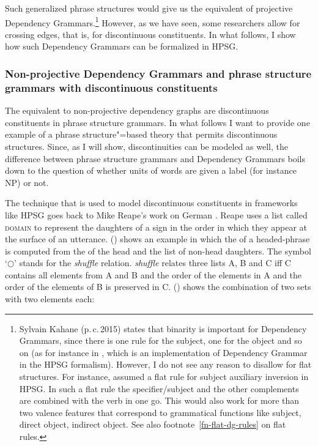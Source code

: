 \noindent
Such generalized phrase structures would give us the equivalent of projective Dependency
Grammars.\footnote{\label{fn-dg-binary-branching}%
Sylvain Kahane (p.\,c.\,2015) states that binarity is important for Dependency Grammars, since
there is one rule for the subject, one for the object and so on (as for instance in
\citealp{Kahane2009a}, which is an implementation of Dependency Grammar in the HPSG formalism). However, I do not see any reason
to disallow for flat structures. For instance, \citet[]{GSag2000a-u} assumed a flat rule for subject
auxiliary inversion in HPSG. In such a flat rule the specifier/subject and the other complements are
combined with the verb in one go. This would also work for more than two valence features that correspond
to grammatical functions like subject, direct object, indirect object. See also
footnote~\ref{fn-flat-dg-rules} on flat rules.
} However, as we have seen, some researchers allow for crossing edges, that is, for
discontinuous constituents. In what follows, I show how such Dependency Grammars can be formalized in
HPSG.

\subsubsection{Non-projective Dependency Grammars and phrase structure grammars with discontinuous constituents}
\label{sec-discontinuous-constituents-HPSG}

\largerpage
The equivalent to non-projective dependency graphs are discontinuous constituents in phrase
structure grammars. In what follows I want to provide one
example of a phrase structure"=based theory that permits discontinuous structures. Since, as I
will show, discontinuities can be modeled as well, the difference between phrase structure grammars
and Dependency Grammars boils down to the question of whether units of words are given a label (for
instance NP) or not.

The technique that is used to model discontinuous constituents in frameworks like HPSG goes back to Mike Reape's work on German
\citeyearpar{Reape91,Reape92a,Reape94a}. 
Reape uses a list called \textsc{domain} to represent the daughters of a sign in the order in
which they appear at the surface of an utterance. () shows an example in which the \domv of a
headed-phrase is computed from the \domv of the head and the list of non-head daughters.
\ea
{} \impl
{}
\z
The symbol `$\bigcirc$'\is{$\bigcirc$}\label{rel-shuffle}
stands for the \emph{shuffle} relation. \emph{shuffle} relates three lists A, B and C iff C
contains all elements from A and B and the order of the elements in A and the order of the elements
of B is preserved in C. () shows the combination of two sets with two elements each:

